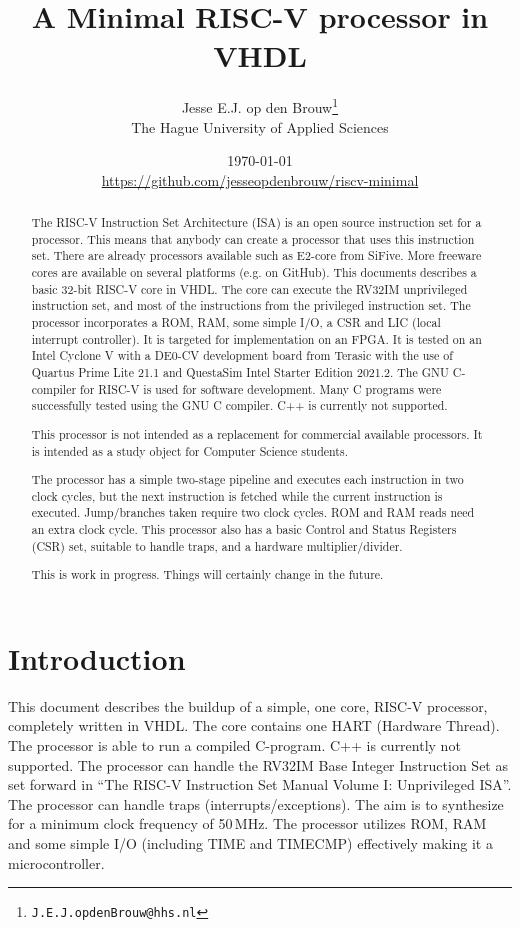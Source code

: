 \documentclass[12pt]{article}
\author{Jesse E.J. op den Brouw\thanks{\texttt{J.E.J.opdenBrouw@hhs.nl}}\\[2ex]The Hague University of Applied Sciences}
\title{A Minimal RISC-V processor in VHDL}
\date{\today\\[2ex]\normalsize\url{https://github.com/jesseopdenbrouw/riscv-minimal}}
\begin{document}
\maketitle

\vfill
\begin{abstract}
\baselineskip
\noindent
The RISC-V Instruction Set Architecture (ISA) is an open source instruction set for a processor. This means that anybody can create a processor that uses this instruction set. There are already processors available such as E2-core from SiFive. More freeware cores are available on several platforms (e.g. on GitHub). This documents describes a basic 32-bit RISC-V core in VHDL. The core can execute the RV32IM unprivileged instruction set, and most of the instructions from the privileged instruction set. The processor incorporates a ROM, RAM, some simple I/O, a CSR and LIC (local interrupt controller). It is targeted for implementation on an FPGA. It is tested on an Intel Cyclone V with a DE0-CV development board from Terasic with the use of Quartus Prime Lite 21.1 and QuestaSim Intel Starter Edition 2021.2. The GNU C-compiler for RISC-V is used for software development. Many C programs were successfully tested using the GNU C compiler. C++ is currently not supported.

\noindent
This processor is not intended as a replacement for commercial available processors. It is intended as a study object for Computer Science students.

\noindent
The processor has a simple two-stage pipeline and executes each instruction in two clock cycles, but the next instruction is fetched while the current instruction is executed. Jump/branches taken require two clock cycles. ROM and RAM reads need an extra clock cycle. This processor also has a basic Control and Status Registers (CSR) set, suitable to handle traps, and a hardware multiplier/divider.

\noindent
This is work in progress. Things will certainly change in the future.
\end{abstract}
\vfill

\clearpage
\tableofcontents

\clearpage
\section{Introduction}
This document describes the buildup of a simple, one core, RISC-V processor, completely written in VHDL. The core contains one HART (Hardware Thread). The processor is able to run a compiled C-program. C++ is currently not supported. The processor can handle the RV32IM Base Integer Instruction Set as set forward in ``The RISC-V Instruction Set Manual Volume I: Unprivileged ISA''. The processor can handle traps (interrupts/exceptions). The aim is to synthesize for a minimum clock frequency of 50\,MHz. The processor utilizes ROM, RAM and some simple I/O (including TIME and TIMECMP) effectively making it a microcontroller.
\end{document}
